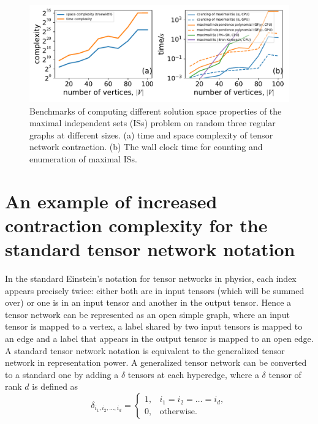 \documentclass[review,supplement,onefignum,onetabnum]{siamart190516}
\begin{document}
\begin{figure} 
    \centering
    \includegraphics[width=\textwidth, trim={0cm 0cm 0cm 0cm}, clip]{figures/fig2.pdf}
    \caption{Benchmarks of computing different solution space properties of the maximal independent sets (ISs) problem on random three regular graphs at different sizes.
    (a) time and space complexity of tensor network contraction. 
    (b) The wall clock time for counting and enumeration of maximal ISs. %
    }
    \label{fig:benchmark-maximal}
\end{figure}



\section{An example of increased contraction complexity for the standard tensor network notation}\label{sec:tensorbad}

In the standard Einstein's notation for tensor networks in physics, each index appears precisely twice: either both are in input tensors (which will be summed over) or one is in an input tensor and another in the output tensor.
Hence a tensor network can be represented as an open simple graph, where an input tensor is mapped to a vertex, a label shared by two input tensors is mapped to an edge and a label that appears in the output tensor is mapped to an open edge.
A standard tensor network notation is equivalent to the generalized tensor network in representation power.
A generalized tensor network can be converted to a standard one by adding a $\delta$ tensors at each hyperedge, where a $\delta$ tensor of rank $d$ is defined as
\begin{equation}
    \delta_{i_1, i_2,\ldots,i_d} = \begin{cases}
        1, & i_1=i_2=\ldots =i_d,\\
        0, & \text{otherwise}.
    \end{cases}
\end{equation}
\end{document}
